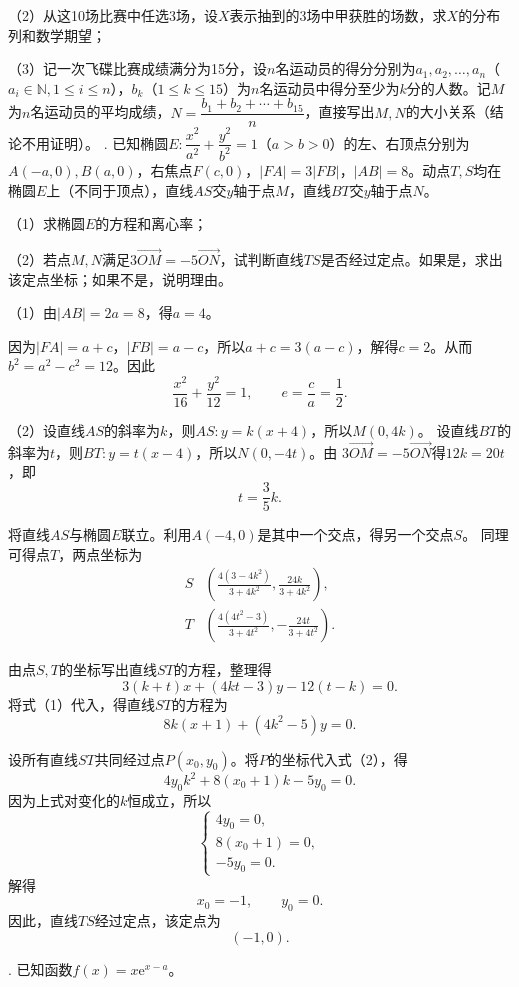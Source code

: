 \noindent（2）从这10场比赛中任选3场，设$X$表示抽到的3场中甲获胜的场数，求$X$的分布列和数学期望；

\noindent（3）记一次飞碟比赛成绩满分为15分，设$n$名运动员的得分分别为$a_1,a_2,\ldots,a_n$（$a_i\in\mathbb{N},1\leqslant i\leqslant n$），$b_k$（$1\leqslant k\leqslant15$）为$n$名运动员中得分至少为$k$分的人数。记$M$为$n$名运动员的平均成绩，$N=\dfrac{b_1+b_2+\cdots+b_{15}}{n}$，直接写出$M,N$的大小关系（结论不用证明）。
\newpage
{}. 已知椭圆$E:\dfrac{x^2}{a^2}+\dfrac{y^2}{b^2}=1$（$a>b>0$）的左、右顶点分别为$A(-a,0),B(a,0)$，右焦点$F(c,0)$，$|FA|=3|FB|$，$|AB|=8$。动点$T,S$均在椭圆$E$上（不同于顶点），直线$AS$交$y$轴于点$M$，直线$BT$交$y$轴于点$N$。

\noindent（1）求椭圆$E$的方程和离心率；

\noindent（2）若点$M,N$满足$3\overrightarrow{OM}=-5\overrightarrow{ON}$，试判断直线$TS$是否经过定点。如果是，求出该定点坐标；如果不是，说明理由。

\begin{solution}
\begingroup
\setlength{\abovedisplayskip}{3pt}
\setlength{\belowdisplayskip}{3pt}
\setlength{\abovedisplayshortskip}{2pt}
\setlength{\belowdisplayshortskip}{2pt}
\noindent（1）由$|AB|=2a=8$，得$a=4$。

因为$|FA|=a+c$，$|FB|=a-c$，所以$a+c=3(a-c)$，解得$c=2$。从而
$b^2=a^2-c^2=12$。因此
\[
\boxed{\frac{x^2}{16}+\frac{y^2}{12}=1},
\qquad e=\frac ca=\boxed{\frac12}.
\]

\noindent（2）设直线$AS$的斜率为$k$，则$AS:y=k(x+4)$，所以$M(0,4k)$。
设直线$BT$的斜率为$t$，则$BT:y=t(x-4)$，所以$N(0,-4t)$。由
$3\overrightarrow{OM}=-5\overrightarrow{ON}$得$12k=20t$，即
\[
t=\frac35k. \tag{1}
\]

将直线$AS$与椭圆$E$联立。利用$A(-4,0)$是其中一个交点，得另一个交点$S$。
同理可得点$T$，两点坐标为
\[
\begin{aligned}
S&\left(\frac{4(3-4k^2)}{3+4k^2},\frac{24k}{3+4k^2}\right),\\
T&\left(\frac{4(4t^2-3)}{3+4t^2},-\frac{24t}{3+4t^2}\right).
\end{aligned}
\]

由点$S,T$的坐标写出直线$ST$的方程，整理得
\[
3(k+t)x+(4kt-3)y-12(t-k)=0.
\]
将式（1）代入，得直线$ST$的方程为
\[
8k(x+1)+(4k^2-5)y=0. \tag{2}
\]

设所有直线$ST$共同经过点$P(x_0,y_0)$。将$P$的坐标代入式（2），得
\[
4y_0k^2+8(x_0+1)k-5y_0=0.
\]
因为上式对变化的$k$恒成立，所以
\[
\begin{cases}
4y_0=0,\\
8(x_0+1)=0,\\
-5y_0=0.
\end{cases}
\]
解得
\[
x_0=-1,\qquad y_0=0.
\]
因此，直线$TS$经过定点，该定点为
\[
\boxed{(-1,0)}.
\]
\endgroup
\end{solution}
\newpage
{}. 已知函数$f(x)=x\mathrm{e}^{x-a}$。

